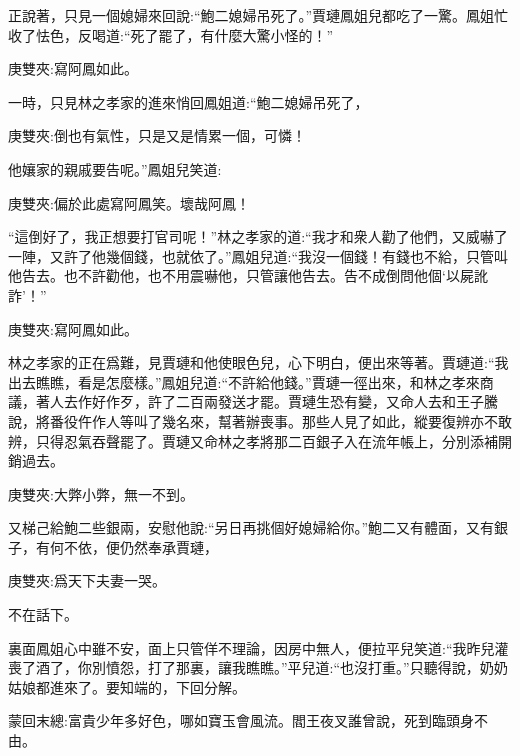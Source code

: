 \begin{parag}
    正說著，只見一個媳婦來回說:“鮑二媳婦吊死了。”賈璉鳳姐兒都吃了一驚。鳳姐忙收了怯色，反喝道:“死了罷了，有什麼大驚小怪的！”\begin{note}庚雙夾:寫阿鳳如此。\end{note}一時，只見林之孝家的進來悄回鳳姐道:“鮑二媳婦吊死了，\begin{note}庚雙夾:倒也有氣性，只是又是情累一個，可憐！\end{note}他孃家的親戚要告呢。”鳳姐兒笑道:\begin{note}庚雙夾:偏於此處寫阿鳳笑。壞哉阿鳳！\end{note}“這倒好了，我正想要打官司呢！”林之孝家的道:“我才和衆人勸了他們，又威嚇了一陣，又許了他幾個錢，也就依了。”鳳姐兒道:“我沒一個錢！有錢也不給，只管叫他告去。也不許勸他，也不用震嚇他，只管讓他告去。告不成倒問他個‘以屍訛詐’！”\begin{note}庚雙夾:寫阿鳳如此。\end{note}林之孝家的正在爲難，見賈璉和他使眼色兒，心下明白，便出來等著。賈璉道:“我出去瞧瞧，看是怎麼樣。”鳳姐兒道:“不許給他錢。”賈璉一徑出來，和林之孝來商議，著人去作好作歹，許了二百兩發送才罷。賈璉生恐有變，又命人去和王子騰說，將番役仵作人等叫了幾名來，幫著辦喪事。那些人見了如此，縱要復辨亦不敢辨，只得忍氣吞聲罷了。賈璉又命林之孝將那二百銀子入在流年帳上，分別添補開銷過去。\begin{note}庚雙夾:大弊小弊，無一不到。\end{note}又梯己給鮑二些銀兩，安慰他說:“另日再挑個好媳婦給你。”鮑二又有體面，又有銀子，有何不依，便仍然奉承賈璉，\begin{note}庚雙夾:爲天下夫妻一哭。\end{note}不在話下。
\end{parag}


\begin{parag}
    裏面鳳姐心中雖不安，面上只管佯不理論，因房中無人，便拉平兒笑道:“我昨兒灌喪了酒了，你別憤怨，打了那裏，讓我瞧瞧。”平兒道:“也沒打重。”只聽得說，奶奶姑娘都進來了。要知端的，下回分解。
\end{parag}


\begin{parag}
    \begin{note}蒙回末總:富貴少年多好色，哪如寶玉會風流。閻王夜叉誰曾說，死到臨頭身不由。\end{note}
\end{parag}
